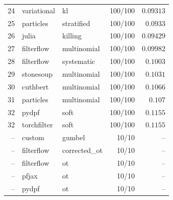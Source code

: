 \begin{table}[!htbp]
\begin{tabular}{rllrr}
24 & variational & kl & 100/100 & $0.09313$ \\
25 & particles & stratified & 100/100 & $0.0933$ \\
26 & julia & killing & 100/100 & $0.09429$ \\
27 & filterflow & multinomial & 100/100 & $0.09982$ \\
28 & filterflow & systematic & 100/100 & $0.1003$ \\
29 & stonesoup & multinomial & 100/100 & $0.1031$ \\
30 & cuthbert & multinomial & 100/100 & $0.1066$ \\
31 & particles & multinomial & 100/100 & $0.107$ \\
32 & pydpf & soft & 100/100 & $0.1155$ \\
32 & torchfilter & soft & 100/100 & $0.1155$ \\
-- & custom & gumbel & 10/10 & $\text{--}$ \\
-- & filterflow & corrected\_ot & 10/10 & $\text{--}$ \\
-- & filterflow & ot & 10/10 & $\text{--}$ \\
-- & pfjax & ot & 10/10 & $\text{--}$ \\
-- & pydpf & ot & 10/10 & $\text{--}$ \\
\bottomrule
\end{tabular}
\end{table}


